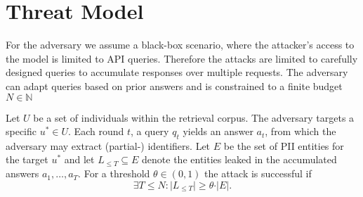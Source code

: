 \section{Threat Model}\label{background-sec:threat-model}
For the adversary we assume a black-box scenario, where the attacker's access to the model is limited to API queries. Therefore the attacks are limited to carefully designed queries to accumulate responses over multiple requests. The adversary can adapt queries based on prior answers and is constrained to a finite budget $N \in \mathbb{N}$

Let $U$ be a set of individuals within the retrieval corpus. The adversary targets a specific $u^* \in U$. Each round $t$, a query $q_t$ yields an answer $a_t$, from which the adversary may extract (partial-) identifiers. 
Let $E$ be the set of PII entities for the target $u^*$ and let $L_{\leq T}\subseteq E$ denote the entities leaked in the accumulated answers $a_1,\dots,a_T$. For a threshold $\theta\in(0,1)$ the attack is successful if
\[
    \exists T \leq N: \vert L_{\leq T}\vert \geq \theta \cdot \vert E\vert.
\]


